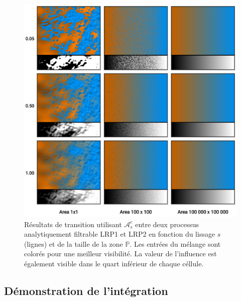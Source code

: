 \documentclass[9pt, twocolumn]{article} %
\begin{document}

\newpage

\begin{figure}
  \includegraphics[width=\linewidth]{figures/MixMax_Scale.png}
  \caption{
    Résultats de transition utilisant $\mathcal{A}^c_s$ entre deux processus analytiquement filtrable LRP1 et LRP2 en fonction du lissage $s$ (lignes) et de la taille de la zone $\mathbb{P}$. Les entrées du mélange sont colorés pour une meilleur visibilité. La valeur de l'influence est également visible dans le quart inférieur de chaque céllule.
  }
  \label{fig::MixMax_Scale}
\end{figure}

\subsection{Démonstration de l'intégration}
\end{document}
